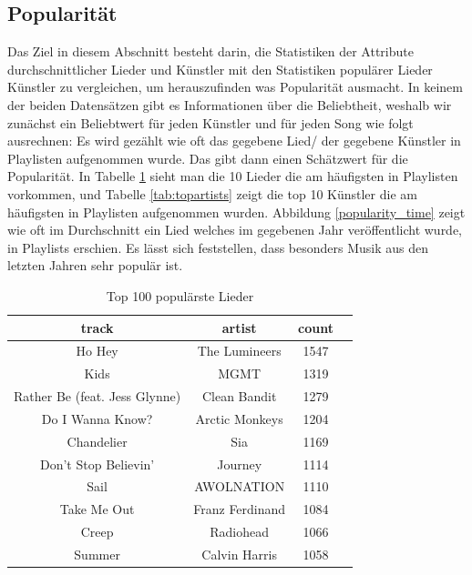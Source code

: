 \documentclass[conference]{IEEEtran}
\begin{document}
\subsection{Popularität}
Das Ziel in diesem Abschnitt besteht darin, die Statistiken der Attribute durchschnittlicher Lieder und Künstler mit den Statistiken populärer Lieder Künstler zu vergleichen, um herauszufinden was Popularität ausmacht.
In keinem der beiden Datensätzen gibt es Informationen über die Beliebtheit, weshalb wir zunächst ein Beliebtwert für jeden Künstler und für jeden Song wie folgt ausrechnen: Es wird gezählt wie oft das gegebene Lied/ der gegebene Künstler in Playlisten aufgenommen wurde. Das gibt dann einen Schätzwert für die Popularität. 
In Tabelle \ref{tab:topsongs} sieht man die 10 Lieder die am häufigsten in Playlisten vorkommen, und Tabelle \ref{tab:topartists} zeigt die top 10 Künstler die am häufigsten in Playlisten aufgenommen wurden.
Abbildung \ref{popularity_time} zeigt wie oft im Durchschnitt ein Lied welches im gegebenen Jahr veröffentlicht wurde, in Playlists erschien. Es lässt sich feststellen, dass besonders Musik aus den letzten Jahren sehr populär ist.

\begin{table}[h]
\centering
\begin{tabular}{c c c c} 
\hline
track & artist & count \\ [0.5ex] 
\hline
Ho Hey & The Lumineers & 1547 \\ 
Kids & MGMT & 1319 \\ 
Rather Be (feat. Jess Glynne) & Clean Bandit & 1279 \\ 
Do I Wanna Know? & Arctic Monkeys & 1204 \\ 
Chandelier & Sia & 1169 \\ 
Don't Stop Believin' & Journey & 1114 \\ 
Sail & AWOLNATION & 1110 \\ 
Take Me Out & Franz Ferdinand & 1084 \\ 
Creep & Radiohead & 1066 \\ 
Summer & Calvin Harris & 1058 \\ [1ex] 
\hline
\end{tabular}

\caption{Top 100 populärste Lieder}
\label{tab:topsongs}
\end{table}
\end{document}

